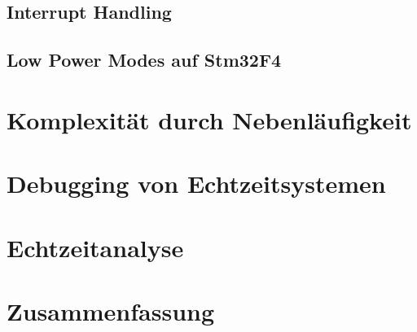 \documentclass[ngerman]{seminarvorlage}
\begin{document}
\subsection{Interrupt Handling}
\subsection{Low Power Modes auf Stm32F4}
\label{sec:Low Power Modes} 
\section{Komplexität durch Nebenläufigkeit}
\section{Debugging von Echtzeitsystemen} 
\label{sec:Debugging von Echtzeitsystemen}
\section{Echtzeitanalyse}
\label{sec:Echtzeitanalyse} 

 
\section{Zusammenfassung}
\pagebreak

\end{document}
